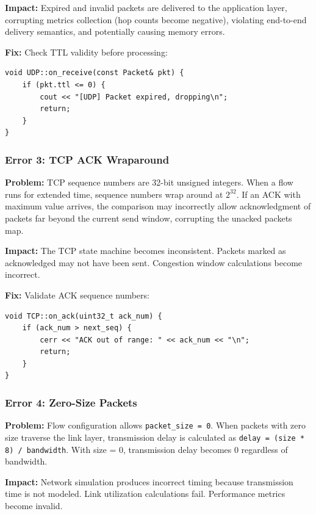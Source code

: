 \documentclass[11pt,a4paper]{article}
\begin{document}
\textbf{Impact:}
Expired and invalid packets are delivered to the application layer, corrupting metrics collection (hop counts become negative), violating end-to-end delivery semantics, and potentially causing memory errors.

\textbf{Fix:}
Check TTL validity before processing:
\begin{lstlisting}
void UDP::on_receive(const Packet& pkt) {
    if (pkt.ttl <= 0) {
        cout << "[UDP] Packet expired, dropping\n";
        return;
    }
}
\end{lstlisting}

\vspace{0.5cm}

\subsubsection{Error 3: TCP ACK Wraparound}

\textbf{Problem:}
TCP sequence numbers are 32-bit unsigned integers. When a flow runs for extended time, sequence numbers wrap around at $2^{32}$. If an ACK with maximum value arrives, the comparison may incorrectly allow acknowledgment of packets far beyond the current send window, corrupting the unacked packets map.

\textbf{Impact:}
The TCP state machine becomes inconsistent. Packets marked as acknowledged may not have been sent. Congestion window calculations become incorrect.

\textbf{Fix:}
Validate ACK sequence numbers:
\begin{lstlisting}
void TCP::on_ack(uint32_t ack_num) {
    if (ack_num > next_seq) {
        cerr << "ACK out of range: " << ack_num << "\n";
        return;
    }
}
\end{lstlisting}

\vspace{0.5cm}

\subsubsection{Error 4: Zero-Size Packets}

\textbf{Problem:}
Flow configuration allows \texttt{packet\_size = 0}. When packets with zero size traverse the link layer, transmission delay is calculated as \texttt{delay = (size * 8) / bandwidth}. With size = 0, transmission delay becomes 0 regardless of bandwidth.

\textbf{Impact:}
Network simulation produces incorrect timing because transmission time is not modeled. Link utilization calculations fail. Performance metrics become invalid.
\end{document}
